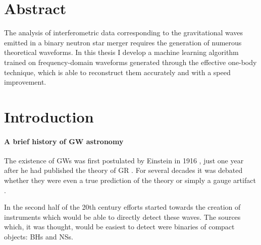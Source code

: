 \documentclass[main.tex]{subfiles}
\begin{document}
\vspace*{\fill}
\section*{Abstract}
The analysis of interferometric data corresponding to the gravitational waves emitted in a binary neutron star merger requires the generation of numerous theoretical waveforms.
In this thesis I develop a machine learning algorithm trained on frequency-domain waveforms generated through the effective one-body technique, which is able to reconstruct them accurately and with a speed improvement.
\vspace*{\fill}


\newpage

\tableofcontents




\newpage

\section*{Introduction}


\paragraph{A brief history of GW astronomy}

The existence of \acp{GW} was first postulated by Einstein in 1916 \cites{1916SPAW.......688E}{1918SPAW.......154E}, just one year after he had published the theory of \ac{GR} \cite[]{einsteinFeldgleichungenGravitation1915}. 
For several decades it was debated whether they were even a true prediction of the theory or simply a gauge artifact \cite{kennefickTravelingSpeedThought2007}. 

In the second half of the 20th century efforts started towards the creation of instruments which would be able to directly detect these waves. 
The sources which, it was thought, would be easiest to detect were binaries of compact objects: \acp{BH} and \acp{NS}.
\end{document}
